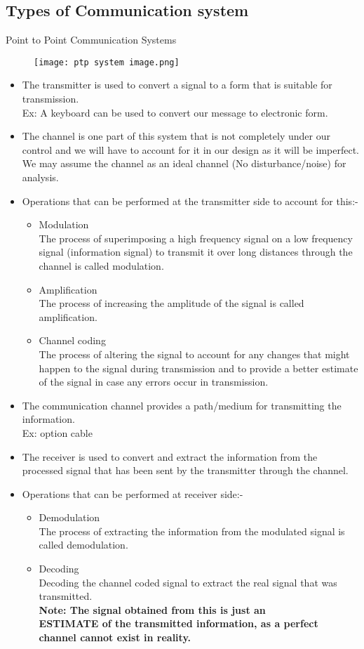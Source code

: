 \documentclass{article}
\begin{document}
\subsection{Types of Communication system}
\Large
Point to Point Communication Systems
\begin{figure}[htp]
    \centering
    \texttt{[image: ptp system image.png]}
\end{figure}
\begin{itemize}
    \item The transmitter is used to convert a signal to a form that is suitable for transmission.\\
    Ex: A keyboard can be used to convert our message to electronic form.
    \item The channel is one part of this system that is not completely under our control and we will have to account for it in our design as it will be imperfect.
    We may assume the channel as an ideal channel (No disturbance/noise) for analysis.
    \item Operations that can be performed at the transmitter side to account for this:-
    \begin{itemize}
        \item Modulation\\
        The process of superimposing a high frequency signal on a low frequency signal (information signal) to transmit it over long distances through the channel is called modulation.
        \item 	Amplification\\
        The process of increasing the amplitude of the signal is called amplification.
        \item Channel coding\\
        The process of altering the signal to account for any changes that might happen to the signal during transmission and to provide a better estimate of the signal in case any errors occur in transmission.
    \end{itemize}
    \item The communication channel provides a path/medium for transmitting the information.\\
    Ex: option cable
    \item The receiver is used to convert and extract the information from the processed signal that has been sent by the transmitter through the channel.
    \item Operations that can be performed at receiver side:-
    \begin{itemize}
        \item Demodulation\\
        The process of extracting the information from the modulated signal is called demodulation.
        \item Decoding\\
        Decoding the channel coded signal to extract the real signal that was transmitted.\\
        \textbf{Note: The signal obtained from this is just an\\ ESTIMATE of the transmitted information, as a perfect channel cannot exist in reality.}
    \end{itemize}
\end{itemize}
\end{document}

